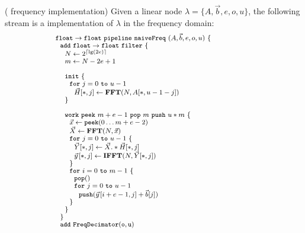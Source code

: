 \documentclass{sig-alternate}
\begin{document}
{\begin{transformation} ({\Naive} frequency implementation)
Given a linear node $\lambda = \{A, {\vec b}, e, o, u\}$, the
following stream is a {\naive} implementation of $\lambda$ in the
frequency domain:
\begin{equation} \nonumber
{\small
  \begin{array}{ll}
    {\tt float \rightarrow float}~{\tt pipeline~naiveFreq~}(A, {\vec b}, e, o, u){\tt ~\{} & \hspace{40pt}\\
    ~~{\tt add~float \rightarrow float~filter~\{}\\
    ~~~~N \leftarrow 2^{\lceil \lg(2e) \rceil} \\
    ~~~~m \leftarrow N-2e+1 \\
    \\
    ~~~~{\tt init}~{\tt \{} \\
    ~~~~~~{\tt for}~j=0~{\tt to}~u-1\\
    ~~~~~~~~\vec{H}[*,j] \leftarrow \mathbf{FFT}(N,A[*,u-1-j]) \\
    ~~~~{\tt \}} \\
    \\
    ~~~~{\tt work}~{\tt peek}~m+e-1~{\tt pop}~m~{\tt push}~u*m~{\tt \{} \\
    ~~~~~~\vec{x} \leftarrow {\tt peek}(0 \dots m+e-2 ) \\
    ~~~~~~\vec{X} \leftarrow \mathbf{FFT} (N, \vec{x}) \\
    ~~~~~~{\tt for}~j=0~{\tt to}~u-1~{\tt \{}\\
    ~~~~~~~~\vec{Y}[*,j] \leftarrow \vec{X} .* \vec{H}[*,j] \\
    ~~~~~~~~\vec{y}\hspace{1pt}[*,j] \leftarrow \mathbf{IFFT}(N, \vec{Y}[*,j]) \\
    ~~~~~~{\tt \}} \\
    ~~~~~~{\tt for}~i=0~{\tt to}~m-1~{\tt \{}\\
    ~~~~~~~~{\tt pop()} \\
    ~~~~~~~~{\tt for}~j=0~{\tt to}~u-1\\
    ~~~~~~~~~~{\tt push}(\vec{y}\hspace{1pt}[i+e-1,j] + {\vec b}[j])\\
    ~~~~~~{\tt \}} \\
    ~~~~{\tt \}} \\
    ~~{\tt \}} \\
    ~~{\tt add~FreqDecimator(o, u)} \\

\end{array}}
\end{equation}
\end{transformation}}
\end{document}
